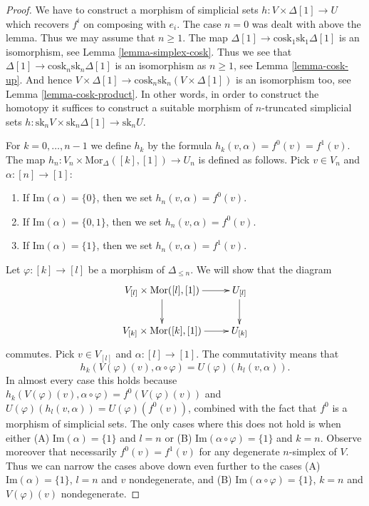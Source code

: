 \begin{proof}
We have to construct
a morphism of simplicial sets $h : V \times \Delta[1] \to U$
which recovers $f^i$ on composing with $e_i$.
The case $n = 0$ was dealt with above the lemma.
Thus we may assume that $n \geq 1$.
The map $\Delta[1] \to \text{cosk}_1 \text{sk}_1 \Delta[1]$
is an isomorphism, see Lemma \ref{lemma-simplex-cosk}.
Thus we see that $\Delta[1] \to \text{cosk}_n \text{sk}_n \Delta[1]$
is an isomorphism as $n \geq 1$, see
Lemma \ref{lemma-cosk-up}. And hence $V \times \Delta[1] \to
\text{cosk}_n \text{sk}_n (V \times \Delta[1])$
is an isomorphism too, see Lemma \ref{lemma-cosk-product}.
In other words, in order to construct the homotopy
it suffices to construct a suitable
morphism of $n$-truncated simplicial sets
$h : \text{sk}_n V \times \text{sk}_n \Delta[1] \to \text{sk}_n U$.

\medskip\noindent
For $k = 0, \ldots, n - 1$ we define $h_k$ by the
formula $h_k(v, \alpha) = f^0(v) = f^1(v)$.
The map $h_n : V_n \times \text{Mor}_{\Delta}([k], [1]) \to U_n$
is defined as follows. Pick $v \in V_n$ and $\alpha : [n] \to [1]$:
\begin{enumerate}
\item If $\text{Im}(\alpha) = \{0\}$, then we set $h_n(v, \alpha) = f^0(v)$.
\item If $\text{Im}(\alpha) = \{0, 1\}$, then we set $h_n(v, \alpha) = f^0(v)$.
\item If $\text{Im}(\alpha) = \{1\}$, then we set $h_n(v, \alpha) = f^1(v)$.
\end{enumerate}
Let $\varphi : [k] \to [l]$ be a morphism of $\Delta_{\leq n}$.
We will show that the diagram
$$
\xymatrix{
V_{[l]} \times \text{Mor}([l], [1]) \ar[r] \ar[d] &
U_{[l]} \ar[d] \\
V_{[k]} \times \text{Mor}([k], [1]) \ar[r] &
U_{[k]}
}
$$
commutes.
Pick $v \in V_{[l]}$ and $\alpha : [l] \to [1]$.
The commutativity means that
$$
h_k(V(\varphi)(v), \alpha \circ \varphi)
=
U(\varphi)(h_l(v, \alpha)).
$$
In almost every case this holds because
$h_k(V(\varphi)(v), \alpha \circ \varphi) = f^0(V(\varphi)(v))$
and $U(\varphi)(h_l(v, \alpha)) = U(\varphi)(f^0(v))$, combined
with the fact that $f^0$ is a morphism of simplicial sets.
The only cases where this does not hold is when
either (A) $\text{Im}(\alpha) = \{1\}$ and $l = n$
or (B) $\text{Im}(\alpha \circ \varphi) = \{1\}$ and $k = n$.
Observe moreover that necessarily $f^0(v) = f^1(v)$
for any degenerate $n$-simplex of $V$.
Thus we can narrow the cases above down even further
to the cases (A) $\text{Im}(\alpha) = \{1\}$, $l = n$
and $v$ nondegenerate, and (B)
$\text{Im}(\alpha \circ \varphi) = \{1\}$, $k = n$
and $V(\varphi)(v)$ nondegenerate.


\end{proof}
